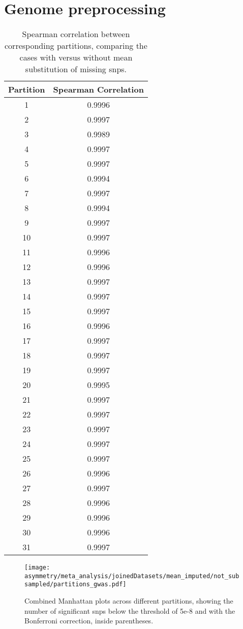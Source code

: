 \appendix
\chapter{Genome preprocessing}

\begin{table}[!htp]\centering
	\scriptsize
	\begin{tabular}{cc}\toprule
		\textbf{Partition} &\textbf{Spearman Correlation} \\\midrule
		1 &0.9996 \\
		2 &0.9997 \\
		3 &0.9989 \\
		4 &0.9997 \\
		5 &0.9997 \\
		6 &0.9994 \\
		7 &0.9997 \\
		8 &0.9994 \\
		9 &0.9997 \\
		10 &0.9997 \\
		11 &0.9996 \\
		12 &0.9996 \\
		13 &0.9997 \\
		14 &0.9997 \\
		15 &0.9997 \\
		16 &0.9996 \\
		17 &0.9997 \\
		18 &0.9997 \\
		19 &0.9997 \\
		20 &0.9995 \\
		21 &0.9997 \\
		22 &0.9997 \\
		23 &0.9997 \\
		24 &0.9997 \\
		25 &0.9997 \\
		26 &0.9996 \\
		27 &0.9997 \\
		28 &0.9996 \\
		29 &0.9996 \\
		30 &0.9996 \\
		31 &0.9997 \\
		\bottomrule
	\end{tabular}
\caption[Spearman correlation assessing mean substitution effect]{Spearman correlation between corresponding partitions, comparing the cases with versus without mean substitution of missing \acp{snp}.}
\label{tab: spearman_no_vs_mean}
\end{table}
\begin{figure}
\begin{adjustwidth}{-3 cm}{-2.5 cm}\centering
	

	\texttt{[image: asymmetry/meta\_analysis/joinedDatasets/mean\_imputed/not\_subsampled/partitions\_gwas.pdf]}
	\caption[Combined Manhattan plots across different partitions]{Combined Manhattan plots across different partitions, showing the number of significant \acp{snp} below the threshold of 5e-8 and with the Bonferroni correction, inside parentheses.}
	\label{fig:part_manhattan}


\end{adjustwidth}
\end{figure}

